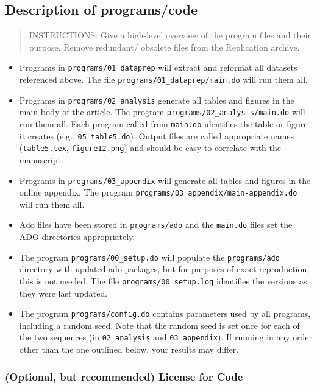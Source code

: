 \documentclass[
]{article}
\providecommand{\tightlist}{%
  \setlength{\itemsep}{0pt}\setlength{\parskip}{0pt}}
\begin{document}
\hypertarget{description-of-programscode}{%
\subsection{Description of
programs/code}\label{description-of-programscode}}

\begin{quote}
INSTRUCTIONS: Give a high-level overview of the program files and their
purpose. Remove redundant/ obsolete files from the Replication archive.
\end{quote}

\begin{itemize}
\tightlist
\item
  Programs in \texttt{programs/01\_dataprep} will extract and reformat
  all datasets referenced above. The file
  \texttt{programs/01\_dataprep/main.do} will run them all.
\item
  Programs in \texttt{programs/02\_analysis} generate all tables and
  figures in the main body of the article. The program
  \texttt{programs/02\_analysis/main.do} will run them all. Each program
  called from \texttt{main.do} identifies the table or figure it creates
  (e.g., \texttt{05\_table5.do}). Output files are called appropriate
  names (\texttt{table5.tex}, \texttt{figure12.png}) and should be easy
  to correlate with the manuscript.
\item
  Programs in \texttt{programs/03\_appendix} will generate all tables
  and figures in the online appendix. The program
  \texttt{programs/03\_appendix/main-appendix.do} will run them all.
\item
  Ado files have been stored in \texttt{programs/ado} and the
  \texttt{main.do} files set the ADO directories appropriately.
\item
  The program \texttt{programs/00\_setup.do} will populate the
  \texttt{programs/ado} directory with updated ado packages, but for
  purposes of exact reproduction, this is not needed. The file
  \texttt{programs/00\_setup.log} identifies the versions as they were
  last updated.
\item
  The program \texttt{programs/config.do} contains parameters used by
  all programs, including a random seed. Note that the random seed is
  set once for each of the two sequences (in \texttt{02\_analysis} and
  \texttt{03\_appendix}). If running in any order other than the one
  outlined below, your results may differ.
\end{itemize}

\hypertarget{optional-but-recommended-license-for-code}{%
\subsubsection{(Optional, but recommended) License for
Code}\label{optional-but-recommended-license-for-code}}
\end{document}
